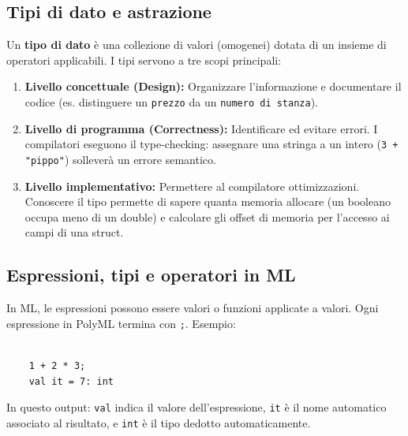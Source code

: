 \documentclass[12pt, a4paper]{article}
\begin{document}
\subsection{Tipi di dato e astrazione}
Un \textbf{tipo di dato} è una collezione di valori (omogenei) dotata di un insieme di operatori applicabili.
I tipi servono a tre scopi principali:
\begin{enumerate}
\item \textbf{Livello concettuale (Design):} Organizzare l'informazione e documentare il codice (es. distinguere un \texttt{prezzo} da un \texttt{numero di stanza}).
\item \textbf{Livello di programma (Correctness):} Identificare ed evitare errori. I compilatori eseguono il type-checking: assegnare una stringa a un intero (\texttt{3 + "pippo"}) solleverà un errore semantico.
\item \textbf{Livello implementativo:} Permettere al compilatore ottimizzazioni. Conoscere il tipo permette di sapere quanta memoria allocare (un booleano occupa meno di un double) e calcolare gli offset di memoria per l'accesso ai campi di una struct.
\end{enumerate}  

\subsection{Espressioni, tipi e operatori in ML}
In ML, le espressioni possono essere valori o funzioni applicate a valori.
Ogni espressione in PolyML termina con \texttt{;}.
Esempio:
\begin{verbatim}  

    1 + 2 * 3;
    val it = 7: int
    \end{verbatim}

\newpage

    In questo output: \texttt{val} indica il valore dell'espressione, \texttt{it} è il nome automatico associato al risultato, e \texttt{int} è il tipo dedotto automaticamente.  
\end{document}

